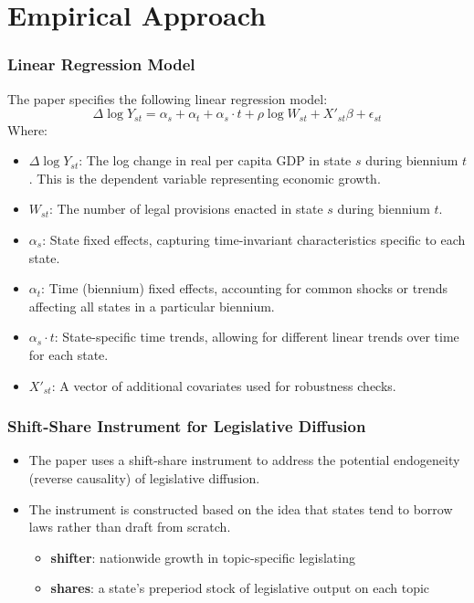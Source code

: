\documentclass{beamer}
\begin{document}
\section{Empirical Approach}
\begin{frame}
    \frametitle{Linear Regression Model}
    \footnotesize
    The paper specifies the following linear regression model:
    \begin{equation}
        \Delta \log Y_{st} = \alpha_s + \alpha_t + \alpha_s \cdot t + \rho \log W_{st} + X'_{st}\beta + \epsilon_{st}
    \end{equation}
    Where:
    \begin{itemize}
        \item $\Delta \log Y_{st}$: The log change in real per capita GDP in state $s$ during biennium $t$. This is the dependent variable representing economic growth.
        \item $W_{st}$: The number of legal provisions enacted in state $s$ during biennium $t$.
        \item $\alpha_s$: State fixed effects, capturing time-invariant characteristics specific to each state.
        \item $\alpha_t$: Time (biennium) fixed effects, accounting for common shocks or trends affecting all states in a particular biennium.
        \item $\alpha_s \cdot t$: State-specific time trends, allowing for different linear trends over time for each state.
        \item $X'_{st}$: A vector of additional covariates used for robustness checks.
    \end{itemize}
\end{frame}

\begin{frame}
    \frametitle{Shift-Share Instrument for Legislative Diffusion}
    \begin{itemize}
        \item The paper uses a shift-share instrument to address the potential endogeneity (reverse causality) of legislative diffusion.
        \item The instrument is constructed based on the idea that states tend to borrow laws rather than draft from scratch.
        \begin{itemize}
            \item \textbf{shifter}: nationwide growth in topic-specific legislating
            \item \textbf{shares}: a state's preperiod stock of legislative output on each topic
        \end{itemize}

    \end{itemize}   
\end{frame}
\end{document}
